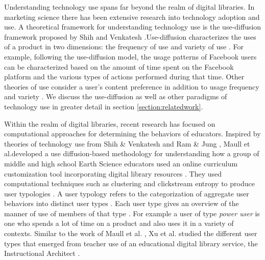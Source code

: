 \documentclass{acm_proc_article-sp}
\begin{document}
Understanding technology use spans far beyond the realm of digital libraries. In marketing science there has been extensive research into technology adoption and use. A  theoretical framework for understanding technology use is the use-diffusion framework proposed by Shih and Venkatesh \cite{shih2004beyond}.Use-diffusion characterizes the uses of a product in two dimensions: the frequency of use and variety of use \cite{shih2004beyond}.  For example, following the use-diffusion model, the usage patterns of Facebook users can be characterized based on the amount of time spent on the Facebook platform and the various types of actions performed during that time. Other theories of use consider a user's content preference in addition to usage frequency and variety \cite{brandtzaeg2010towards}. We discuss the use-diffusion as well as other paradigms of technology use in greater detail in section \ref{section:relatedwork}. 

Within the realm of digital libraries, recent research has focused on computational approaches for determining the behaviors of educators. Inspired by theories of technology use from Shih \& Venkatesh and Ram \& Jung \cite{shih2004beyond, ram1990conceptualization}, Maull et al.developed a use diffusion-based methodology for understanding how a group of middle and high school Earth Science educators used an online curriculum customization tool incorporating digital library resources \cite{maullunderstanding}. They used computational techniques such as clustering and clickstream entropy to produce user typologies \cite{maullunderstanding}. A user typology refers to the categorization of aggregate user behaviors into distinct user types \cite{brandtzaeg2010towards}. Each user type gives an overview of the manner of use of members of that type \cite{brandtzaeg2010towards}. For example a user of type \textit{power user} is one who spends a lot of time on a product and also uses it in a variety of contexts. Similar to the work of Maull et al. \cite{maullunderstanding}, Xu et al. studied the different  user types that emerged from teacher use of an educational digital library service, the Instructional Architect \cite{xu}. 
\end{document}
